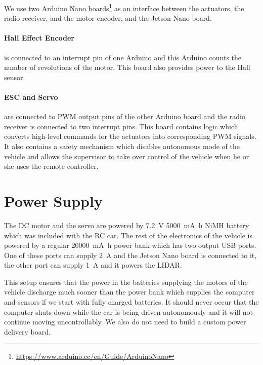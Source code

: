 We use two Arduino Nano boards\footnote{\url{https://www.arduino.cc/en/Guide/ArduinoNano}} as an interface between the actuators, the radio receiver, and the motor encoder, and the Jetson Nano board.

\paragraph{Hall Effect Encoder} is connected to an interrupt pin of one Arduino and this Arduino counts the number of revolutions of the motor. This board also provides power to the Hall sensor.

\paragraph{ESC and Servo} are connected to \gls{PWM} output pins of the other Arduino board and the radio receiver is connected to two interrupt pins. This board contains logic which converts high-level commands for the actuators into corresponding \gls*{PWM} signals. It also contains a safety mechanism which disables autonomous mode of the vehicle and allows the supervisor to take over control of the vehicle when he or she uses the remote controller.

\section{Power Supply}

The \gls*{DC} motor and the servo are powered by \SI{7.2}{\volt} \SI{5000}{\milli\ampere\hour} NiMH battery which was included with the \gls*{RC} car. The rest of the electronics of the vehicle is powered by a regular \SI{20000}{\milli\ampere\hour} power bank which has two output USB ports. One of these ports can supply \SI{2}{\ampere} and the Jetson Nano board is connected to it, the other port can supply \SI{1}{\ampere} and it powers the \gls*{LIDAR}.

This setup ensures that the power in the batteries supplying the motors of the vehicle discharge much sooner than the power bank which supplies the computer and sensors if we start with fully charged batteries. It should never occur that the computer shuts down while the car is being driven autonomously and it will not continue moving uncontrollably. We also do not need to build a custom power delivery board.
